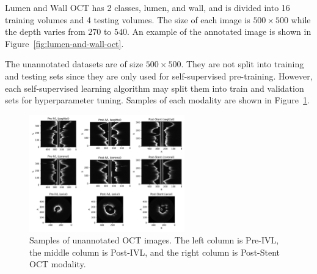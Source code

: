\documentclass[a4paper,11pt,oneside]{report}
\begin{document}
Lumen and Wall OCT has 2 classes, lumen, and wall, and is divided into 16 training volumes and 4 testing volumes. The size of each image is $500\times 500$ while the depth varies from $270$ to $540$. An example of the annotated image is shown in Figure~\ref{fig:lumen-and-wall-oct}.



The unannotated datasets are of size $500\times 500$. They are not split into training and testing sets since they are only used for self-supervised pre-training. However, each self-supervised learning algorithm may split them into train and validation sets for hyperparameter tuning. Samples of each modality are shown in Figure~\ref{fig:unannotated-oct}. 

\begin{figure}[htb]
    \centering
    \includegraphics[width=0.6\textwidth]{figures/fig_datasets_unlabeled_oct_sample.pdf}
    \caption{Samples of unannotated OCT images. The left column is Pre-IVL, the middle column is Post-IVL, and the right column is Post-Stent OCT modality.}
    \label{fig:unannotated-oct}
\end{figure}
\end{document}
